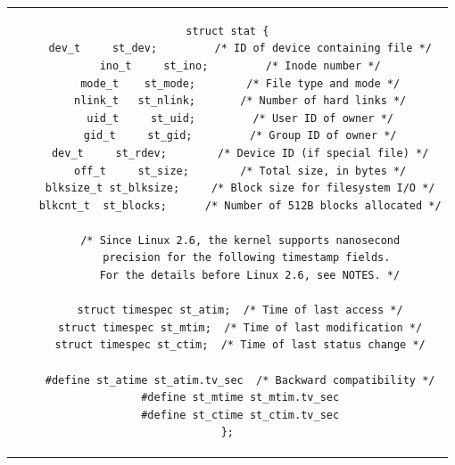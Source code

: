 \begin{center}
\begin{tabular}{c}
\begin{lstlisting}[linewidth=340pt, basicstyle=\footnotesize\sffamily,]
struct stat {
	dev_t     st_dev;         /* ID of device containing file */
	ino_t     st_ino;         /* Inode number */
	mode_t    st_mode;        /* File type and mode */
	nlink_t   st_nlink;       /* Number of hard links */
	uid_t     st_uid;         /* User ID of owner */
	gid_t     st_gid;         /* Group ID of owner */
	dev_t     st_rdev;        /* Device ID (if special file) */
	off_t     st_size;        /* Total size, in bytes */
	blksize_t st_blksize;     /* Block size for filesystem I/O */
	blkcnt_t  st_blocks;      /* Number of 512B blocks allocated */

	/* Since Linux 2.6, the kernel supports nanosecond
	  precision for the following timestamp fields.
	   For the details before Linux 2.6, see NOTES. */

	struct timespec st_atim;  /* Time of last access */
	struct timespec st_mtim;  /* Time of last modification */
	struct timespec st_ctim;  /* Time of last status change */

	#define st_atime st_atim.tv_sec  /* Backward compatibility */
	#define st_mtime st_mtim.tv_sec
	#define st_ctime st_ctim.tv_sec
};
\end{lstlisting}
\end{tabular}
\end{center}